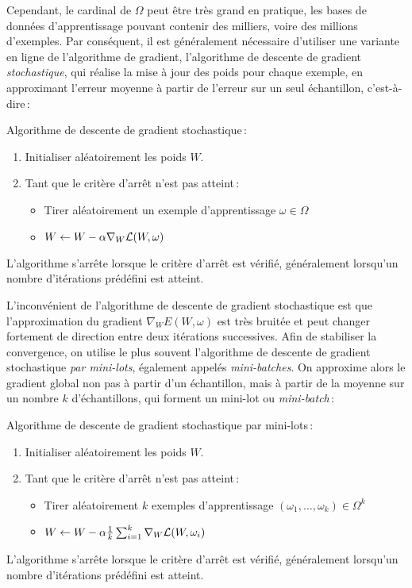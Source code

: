  Cependant, le cardinal de $\Omega$ peut être très grand en pratique, les bases de données d'apprentissage pouvant contenir des milliers, voire des millions d'exemples. Par conséquent, il est généralement nécessaire d'utiliser une variante en ligne de l'algorithme de gradient, l'algorithme de descente de gradient \emph{stochastique}, qui réalise la mise à jour des poids pour chaque exemple, en approximant l'erreur moyenne à partir de l'erreur sur un seul échantillon, c'est-à-dire\,:
\begin{definition}
  Algorithme de descente de gradient stochastique\,:
  \begin{enumerate}
    \item Initialiser aléatoirement les poids $W$.
    \item Tant que le critère d'arrêt n'est pas atteint\,:
      \begin{itemize}
          \item Tirer aléatoirement un exemple d'apprentissage $\omega \in \Omega$
          \item $W \leftarrow W - \alpha \nabla_W \mathcal{L}(W, \omega)$
      \end{itemize}
  \end{enumerate}
L'algorithme s'arrête lorsque le critère d'arrêt est vérifié, généralement lorsqu'un nombre d'itérations prédéfini est atteint.
\end{definition}

L'inconvénient de l'algorithme de descente de gradient stochastique est que l'approximation du gradient $\nabla_W E(W, \omega)$ est très bruitée et peut changer fortement de direction entre deux itérations successives. Afin de stabiliser la convergence, on utilise le plus souvent l'algorithme de descente de gradient stochastique \emph{par mini-lots}, également appelés \emph{mini-batches}. On approxime alors le gradient global non pas à partir d'un échantillon, mais à partir de la moyenne sur un nombre $k$ d'échantillons, qui forment un mini-lot ou \emph{mini-batch}\,:
\begin{definition}
  Algorithme de descente de gradient stochastique par mini-lots\,:
  \begin{enumerate}
    \item Initialiser aléatoirement les poids $W$.
    \item Tant que le critère d'arrêt n'est pas atteint\,:
      \begin{itemize}
          \item Tirer aléatoirement $k$ exemples d'apprentissage $(\omega_1,\dots,\omega_k) \in \Omega^k$
          \item $W \leftarrow W - \alpha \frac{1}{k} \sum_{i=1}^k \nabla_W \mathcal{L}(W, \omega_i)$
      \end{itemize}
  \end{enumerate}
L'algorithme s'arrête lorsque le critère d'arrêt est vérifié, généralement lorsqu'un nombre d'itérations prédéfini est atteint.
\end{definition}

